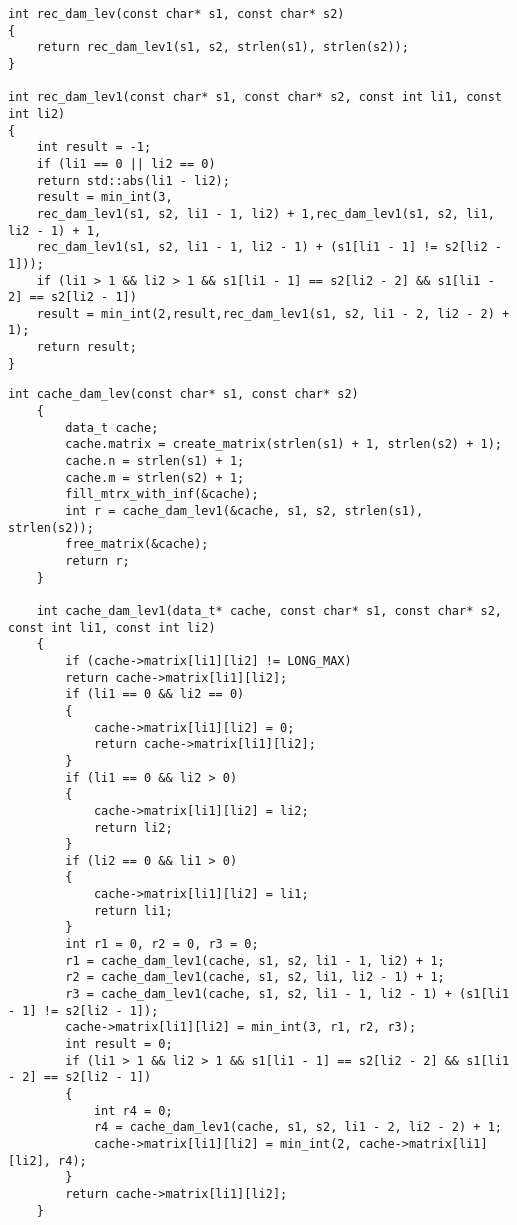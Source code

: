 \begin{center}
\begin{lstlisting}[label=dlr,caption = {Рекурсивый алгоритм поиска пути  Дамерау-Левенштейна}]
int rec_dam_lev(const char* s1, const char* s2)
{
	return rec_dam_lev1(s1, s2, strlen(s1), strlen(s2));
}

int rec_dam_lev1(const char* s1, const char* s2, const int li1, const int li2)
{
	int result = -1;
	if (li1 == 0 || li2 == 0)
	return std::abs(li1 - li2);
	result = min_int(3,
	rec_dam_lev1(s1, s2, li1 - 1, li2) + 1,rec_dam_lev1(s1, s2, li1, li2 - 1) + 1, 
	rec_dam_lev1(s1, s2, li1 - 1, li2 - 1) + (s1[li1 - 1] != s2[li2 - 1]));
	if (li1 > 1 && li2 > 1 && s1[li1 - 1] == s2[li2 - 2] && s1[li1 - 2] == s2[li2 - 1])
	result = min_int(2,result,rec_dam_lev1(s1, s2, li1 - 2, li2 - 2) + 1);
	return result;
}

\end{lstlisting}

\end{center}
\begin{center}
	\begin{lstlisting}[label=dlrc,caption = {Рекурсивый с кешем алгоритм поиска пути  Дамерау-Левенштейна}]
	int cache_dam_lev(const char* s1, const char* s2)
	{
		data_t cache;
		cache.matrix = create_matrix(strlen(s1) + 1, strlen(s2) + 1);
		cache.n = strlen(s1) + 1;
		cache.m = strlen(s2) + 1;
		fill_mtrx_with_inf(&cache);
		int r = cache_dam_lev1(&cache, s1, s2, strlen(s1), strlen(s2));
		free_matrix(&cache);
		return r;
	}
	
	int cache_dam_lev1(data_t* cache, const char* s1, const char* s2, const int li1, const int li2)
	{
		if (cache->matrix[li1][li2] != LONG_MAX)
		return cache->matrix[li1][li2];
		if (li1 == 0 && li2 == 0)
		{
			cache->matrix[li1][li2] = 0;
			return cache->matrix[li1][li2];
		}
		if (li1 == 0 && li2 > 0)
		{
			cache->matrix[li1][li2] = li2;
			return li2;
		}
		if (li2 == 0 && li1 > 0)
		{
			cache->matrix[li1][li2] = li1;
			return li1;
		}	
		int r1 = 0, r2 = 0, r3 = 0;
		r1 = cache_dam_lev1(cache, s1, s2, li1 - 1, li2) + 1;
		r2 = cache_dam_lev1(cache, s1, s2, li1, li2 - 1) + 1;
		r3 = cache_dam_lev1(cache, s1, s2, li1 - 1, li2 - 1) + (s1[li1 - 1] != s2[li2 - 1]);
		cache->matrix[li1][li2] = min_int(3, r1, r2, r3);
		int result = 0;
		if (li1 > 1 && li2 > 1 && s1[li1 - 1] == s2[li2 - 2] && s1[li1 - 2] == s2[li2 - 1])
		{
			int r4 = 0;		
			r4 = cache_dam_lev1(cache, s1, s2, li1 - 2, li2 - 2) + 1;	
			cache->matrix[li1][li2] = min_int(2, cache->matrix[li1][li2], r4);
		}
		return cache->matrix[li1][li2];
	}	
	\end{lstlisting}
	
\end{center}
\newpage
